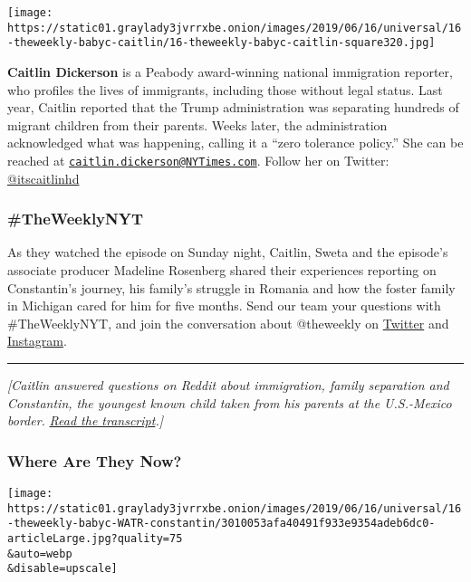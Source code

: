 \texttt{[image: https://static01.graylady3jvrrxbe.onion/images/2019/06/16/universal/16-theweekly-babyc-caitlin/16-theweekly-babyc-caitlin-square320.jpg]}

\textbf{Caitlin Dickerson} is a Peabody award-winning national
immigration reporter, who profiles the lives of immigrants, including
those without legal status. Last year, Caitlin reported that the Trump
administration was separating hundreds of migrant children from their
parents. Weeks later, the administration acknowledged what was
happening, calling it a ``zero tolerance policy.'' She can be reached at
\href{mailto:caitlin.dickerson@NYTimes.com}{\nolinkurl{caitlin.dickerson@NYTimes.com}}.
Follow her on Twitter:
\href{https://twitter.com/itscaitlinhd}{@itscaitlinhd}

\hypertarget{theweeklynyt-}{%
\subsubsection{\#TheWeeklyNYT }\label{theweeklynyt-}}

As they watched the episode on Sunday night, Caitlin, Sweta and the
episode's associate producer Madeline Rosenberg shared their experiences
reporting on Constantin's journey, his family's struggle in Romania and
how the foster family in Michigan cared for him for five months. Send
our team your questions with \#TheWeeklyNYT, and join the conversation
about @theweekly on \href{https://twitter.com/TheWeekly}{Twitter} and
\href{https://www.instagram.com/theweekly/}{Instagram}.

\begin{center}\rule{0.5\linewidth}{\linethickness}\end{center}

\emph{{[}Caitlin answered questions on Reddit about immigration, family
separation and Constantin, the youngest known child taken from his
parents at the U.S.-Mexico border.}
\href{https://www.reddit.com/r/politics/comments/c2xapx/im_caitlin_dickerson_national_immigration/}{\emph{Read
the transcript}}\emph{.{]}}

\hypertarget{where-are-they-now-}{%
\subsubsection{Where Are They Now? }\label{where-are-they-now-}}

\texttt{[image: https://static01.graylady3jvrrxbe.onion/images/2019/06/16/universal/16-theweekly-babyc-WATR-constantin/3010053afa40491f933e9354adeb6dc0-articleLarge.jpg?quality=75\\\&auto=webp\\\&disable=upscale]}

